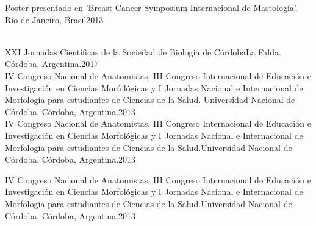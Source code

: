 \documentclass[
	a4paper,
]{fortysecondscv}
\begin{document}
\begin{cvtable}
	{Poster presentado en 'Breast Cancer Symposium Internacional de Mastología'. Río de Janeiro, Brasil}{2013}
\end{cvtable}

\begin{cvtable}

	\\

	{XXI Jornadas Científicas de la Sociedad de Biología de Córdoba}{La Falda. Córdoba, Argentina.}{2017}
	\\


	{IV Congreso Nacional de Anatomistas, III Congreso Internacional de Educación e Investigación en Ciencias Morfológicas y I Jornadas Nacional e Internacional de Morfología para estudiantes de Ciencias de la Salud. Universidad Nacional de Córdoba. Córdoba, Argentina.}{}{2013}
	\\

	{IV Congreso Nacional de Anatomistas, III Congreso Internacional de Educación e Investigación en Ciencias Morfológicas y I Jornadas Nacional e Internacional de Morfología para estudiantes de Ciencias de la Salud.}{Universidad Nacional de Córdoba. Córdoba, Argentina.}{2013}
	\\
\end{cvtable}

\begin{cvtable}
	{IV Congreso Nacional de Anatomistas, III Congreso Internacional de Educación e Investigación en Ciencias Morfológicas y I Jornadas Nacional e Internacional de Morfología para estudiantes de Ciencias de la Salud.}{Universidad Nacional de Córdoba. Córdoba, Argentina.}{2013}
	
	

	
\end{cvtable}
\end{document}
